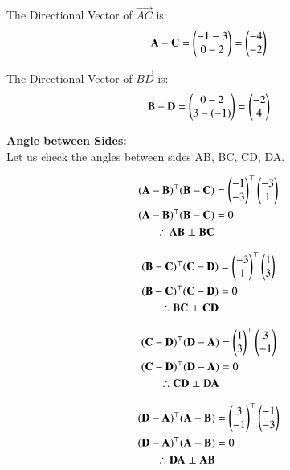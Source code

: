\documentclass[journal,12pt,twocolumn]{IEEEtran}
\begin{document}
The Directional Vector of $\vec{AC}$ is:
\begin{equation}
    \mathbf{A} - \mathbf{C} = \begin{pmatrix}-1-3\\0-2\end{pmatrix} = \begin{pmatrix}-4\\-2\end{pmatrix}
    \label{AC}
\end{equation}

The Directional Vector of $\vec{BD}$ is:
\begin{equation}
    \mathbf{B} - \mathbf{D} = \begin{pmatrix}0-2\\3-(-1)\end{pmatrix} = \begin{pmatrix}-2\\4\end{pmatrix}
    \label{BD}
\end{equation}

\textbf{Angle between Sides:} \\

Let us check the angles between sides AB, BC, CD, DA.

\begin{align}
    (\mathbf{A} - \mathbf{B})^\top(\mathbf{B} - \mathbf{C}) &= \begin{pmatrix}-1\\-3\end{pmatrix}^\top\begin{pmatrix}-3\\1\end{pmatrix} \\
    (\mathbf{A} - \mathbf{B})^\top(\mathbf{B} - \mathbf{C}) &= 0 \\
    \therefore \mathbf{AB} \perp \mathbf{BC}
\end{align}

\begin{align}
    (\mathbf{B} - \mathbf{C})^\top(\mathbf{C} - \mathbf{D}) &= \begin{pmatrix}-3\\1\end{pmatrix}^\top\begin{pmatrix}1\\3\end{pmatrix} \\
    (\mathbf{B} - \mathbf{C})^\top(\mathbf{C} - \mathbf{D}) &= 0 \\
    \therefore \mathbf{BC} \perp \mathbf{CD}
\end{align}

\begin{align}
    (\mathbf{C} - \mathbf{D})^\top(\mathbf{D} - \mathbf{A}) &= \begin{pmatrix}1\\3\end{pmatrix}^\top\begin{pmatrix}3\\-1\end{pmatrix} \\
    (\mathbf{C} - \mathbf{D})^\top(\mathbf{D} - \mathbf{A}) &= 0 \\
    \therefore \mathbf{CD} \perp \mathbf{DA}
\end{align}

\begin{align}
    (\mathbf{D} - \mathbf{A})^\top(\mathbf{A} - \mathbf{B}) &= \begin{pmatrix}3\\-1\end{pmatrix}^\top\begin{pmatrix}-1\\-3\end{pmatrix} \\
    (\mathbf{D} - \mathbf{A})^\top(\mathbf{A} - \mathbf{B}) &= 0 \\
    \therefore \mathbf{DA} \perp \mathbf{AB}
\end{align}
\end{document}
